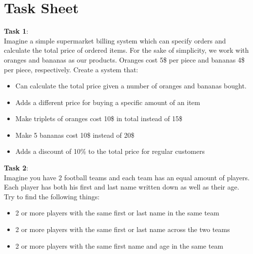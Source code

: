 \chapter{Task Sheet}
\label{chapter:taskSheet}
\textbf{Task 1}:\\
Imagine a simple supermarket billing system which can specify orders and calculate the total price of ordered items. For the sake of simplicity, we work with oranges and bananas as our products. Oranges cost 5\$ per piece and bananas 4\$ per piece, respectively. Create a system that:
\begin{itemize}
\item Can calculate the total price given a number of oranges and bananas bought.
\item Adds a different price for buying a specific amount of an item 
\item Make triplets of oranges cost 10\$ in total instead of 15\$
\item Make 5 bananas cost 10\$ instead of 20\$
\item Adds a discount of 10\% to the total price for regular customers
\end{itemize}

\textbf{Task 2}:\\
Imagine you have 2 football teams and each team has an equal amount of players. Each player has both his first and last name written down as well as their age. Try to find the following things:
\begin{itemize}
\item 2 or more players with the same first or last name in the same team
\item 2 or more players with the same first or last name across the two teams
\item 2 or more players with the same first name and age in the same team
\end{itemize}

